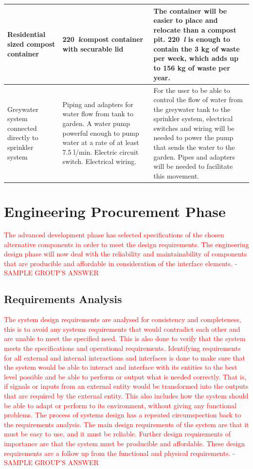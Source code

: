 \documentclass[a4paper,11pt,fleqn]{report}
\begin{document}
\begin{table}[h!]
\begin{center}
\begin{tabular}{p{4.5cm}|p{4.5cm}|p{4.5cm}}
            \hline
    Residential sized compost container & 220~\textit{l}compost container with securable lid  & The container will be easier to place and relocate than a compost pit. 220~\textit{l} is enough to contain the 3 kg of waste per week, which adds up to 156 kg of waste per year.\\
            \hline
    Greywater system connected directly to sprinkler system & Piping and adapters for water flow from tank to garden. A water pump powerful enough to pump water at a rate of at least 7.5 l/min. Electric circuit switch. Electrical wiring.  & For the user to be able to control the flow of water from the greywater tank to the sprinkler system, electrical switches and wiring will be needed to power the pump that sends the water to the garden. Pipes and adapters will be needed to facilitate this movement.\\

    \bottomrule
\end{tabular}
\end{center}
\end{table}
%
\section{Engineering Procurement Phase}
\textcolor{red}{The advanced development phase has selected specifications of the chosen alternative components in order to meet the design requirements. The engineering design phase will now deal with the reliability and maintainability of components that are producible and affordable in consideration of the interface elements. - SAMPLE GROUP'S ANSWER}

\subsection{Requirements Analysis}
\textcolor{red}{The system design requirements are analysed for consistency and completeness, this is to avoid any systems requirements that would contradict each other and are unable to meet the specified need. This is also done to verify that the system meets the specifications and operational requirements. Identifying requirements for all external and internal interactions and interfaces is done to make sure that the system would be able to interact and interface with its entities to the best level possible and be able to perform or output what is needed correctly. That is, if signals or inputs from an external entity would be transformed into the outputs that are required by the external entity. This also includes how the system should be able to adapt or perform to its environment, without giving any functional problems.
The process of systems design has a repeated circumspection back to the requirements analysis. The main design requirements of the system are that it must be easy to use, and it must be reliable. Further design requirements of importance are that the system must be producible and affordable. These design requirements are a follow up from the functional and physical requirements. - SAMPLE GROUP'S ANSWER}
\end{document}
